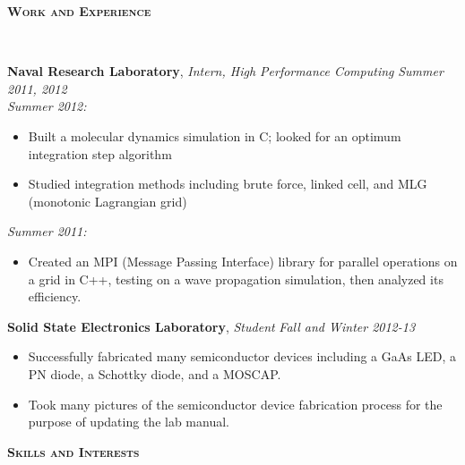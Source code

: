 \documentclass{article}
\newenvironment{changemargin}[2]{%
  \begin{list}{}{%
    \setlength{\topsep}{0pt}%
    \setlength{\leftmargin}{#1}%
    \setlength{\rightmargin}{#2}%
    \setlength{\listparindent}{\parindent}%
    \setlength{\itemindent}{\parindent}%
    \setlength{\parsep}{\parskip}%
  }%
  \item[]}{\end{list}
}
\newcommand{\lineover}{
	\begin{changemargin}{-0.05in}{-0.05in}
		\vspace*{-8pt}
		\hrulefill \\
		\vspace*{-2pt}
	\end{changemargin}
}
\newcommand{\header}[1]{
	\begin{changemargin}{-0.5in}{-0.5in}
		{\large \textbf{\scshape{#1}}}\\
  	\lineover
	\end{changemargin}
}
\newenvironment{body} {
	\vspace*{-16pt}
	\begin{changemargin}{-0.25in}{-0.5in}
  }	
	{\end{changemargin}
}
\begin{document}
\smallskip


\header{Work and Experience}

\begin{body}
	\vspace{14pt}
	\textbf{Naval Research Laboratory}, \emph{Intern, High Performance Computing} \hfill \emph{Summer 2011, 2012}\\
	\emph{Summer 2012:}
	\begin{itemize}%
		\item Built a molecular dynamics simulation in C; looked for an optimum integration step algorithm
		\item Studied integration methods including brute force, linked cell, and MLG (monotonic Lagrangian grid)
	\end{itemize}
	
	\emph{Summer 2011:}
	\begin{itemize}%
		\item Created an MPI (Message Passing Interface) library for parallel operations on a grid in C++, testing on a wave propagation simulation, then analyzed its efficiency.
	\end{itemize}

	\medskip
	
	\textbf{Solid State Electronics Laboratory}, \emph{Student} \hfill \emph{Fall and Winter 2012-13}\\
	\begin{itemize}%
		\item Successfully fabricated many semiconductor devices including a GaAs LED, a PN diode, a Schottky diode, and a MOSCAP.
		\item Took many pictures of the semiconductor device fabrication process for the purpose of updating the lab manual. 
	\end{itemize}
\end{body}

\smallskip


\header{Skills and Interests}
\end{document}
